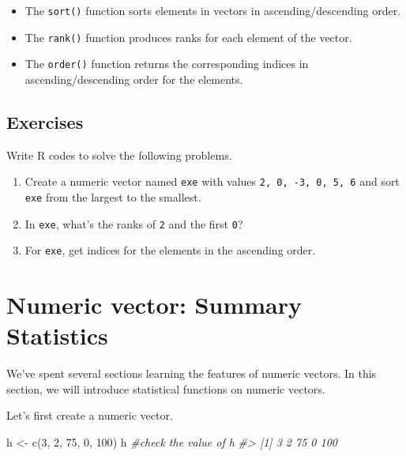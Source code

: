 \documentclass[
]{book}
\newenvironment{Shaded}{\begin{snugshade}}{\end{snugshade}}
\newcommand{\CommentTok}[1]{\textcolor[rgb]{0.56,0.35,0.01}{\textit{#1}}}
\newcommand{\DecValTok}[1]{\textcolor[rgb]{0.00,0.00,0.81}{#1}}
\newcommand{\FunctionTok}[1]{\textcolor[rgb]{0.00,0.00,0.00}{#1}}
\newcommand{\NormalTok}[1]{#1}
\newcommand{\OtherTok}[1]{\textcolor[rgb]{0.56,0.35,0.01}{#1}}
\providecommand{\tightlist}{%
  \setlength{\itemsep}{0pt}\setlength{\parskip}{0pt}}
\begin{document}
\begin{itemize}
\tightlist
\item
  The \texttt{sort()} function sorts elements in vectors in ascending/descending order.
\item
  The \texttt{rank()} function produces ranks for each element of the vector.
\item
  The \texttt{order()} function returns the corresponding indices in ascending/descending order for the elements.
\end{itemize}

\hypertarget{exercises-9}{%
\subsection{Exercises}\label{exercises-9}}

Write R codes to solve the following problems.

\begin{enumerate}
\def\labelenumi{\arabic{enumi}.}
\item
  Create a numeric vector named \texttt{exe} with values \texttt{2,\ 0,\ -3,\ 0,\ 5,\ 6} and sort \texttt{exe} from the largest to the smallest.
\item
  In \texttt{exe}, what's the ranks of \texttt{2} and the first \texttt{0}?
\item
  For \texttt{exe}, get indices for the elements in the ascending order.
\end{enumerate}

\hypertarget{numeric-vector-statistics}{%
\section{Numeric vector: Summary Statistics}\label{numeric-vector-statistics}}

We've spent several sections learning the features of numeric vectors. In this section, we will introduce statistical functions on numeric vectors.

Let's first create a numeric vector.

\begin{Shaded}
\begin{Highlighting}[]
\NormalTok{h }\OtherTok{\textless{}{-}} \FunctionTok{c}\NormalTok{(}\DecValTok{3}\NormalTok{, }\DecValTok{2}\NormalTok{, }\DecValTok{75}\NormalTok{, }\DecValTok{0}\NormalTok{, }\DecValTok{100}\NormalTok{)}
\NormalTok{h }\CommentTok{\#check the value of h}
\CommentTok{\#\textgreater{} [1]   3   2  75   0 100}
\end{Highlighting}
\end{Shaded}
\end{document}
